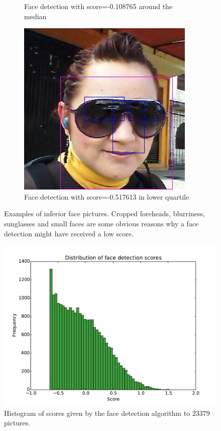 \begin{figure}
\begin{subfigure}[t]{0.3\textwidth}
      \caption{Face detection with score=-0.108765 around the median}
      \label{fig:results:fd:median_detected1}
    \end{subfigure}
    \begin{subfigure}[t]{0.3\textwidth}
      \includegraphics[width=\textwidth]{figures/results/detected_q1_f1c5f486-1697-4089-9bb6-7962d7db630c}
      \caption{Face detection with score=-0.517613 in lower quartile}
      \label{fig:results:fd:q1_detected3}
    \end{subfigure}
\caption{Examples of inferior face pictures. Cropped foreheads, blurriness, sunglasses and small faces are some obvious reasons why a face detection might have received a low score.}
\label{fig:results:fd:other_detected}
\end{figure}

\begin{figure}
    \includegraphics[width=\textwidth]{figures/results/scores_hist}
    \caption{Histogram of scores given by the face detection algorithm to 23379 pictures.}
    \label{fig:results:fd:scores_hist}
\end{figure}


